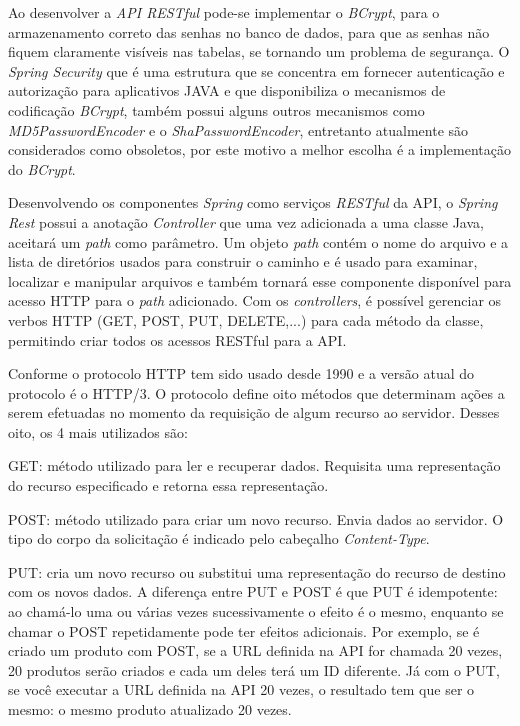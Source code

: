    Ao desenvolver a \textit{API RESTful} pode-se implementar o \textit{BCrypt}, para o armazenamento correto das senhas no banco de dados, para que as senhas não fiquem claramente visíveis nas tabelas, se tornando um problema de segurança. O \textit{Spring Security} que é uma estrutura que se concentra em fornecer autenticação e autorização para aplicativos JAVA e que disponibiliza o mecanismos de codificação \textit{BCrypt}, também possui alguns outros mecanismos como \textit{MD5PasswordEncoder} e o \textit{ShaPasswordEncoder}, entretanto atualmente são considerados como obsoletos, por este motivo a melhor escolha é a implementação do \textit{BCrypt}.
   
    Desenvolvendo os componentes \textit{Spring} como serviços \textit{RESTful} da API, o \textit{Spring Rest} possui a anotação \textit{Controller} que uma vez adicionada a uma classe Java, aceitará um \textit{path} como parâmetro. Um objeto \textit{path} contém o nome do arquivo e a lista de diretórios usados para construir o caminho e é usado para examinar, localizar e manipular arquivos e também tornará esse componente disponível para acesso HTTP para o \textit{path} adicionado. Com os \textit{controllers}, é possível gerenciar os verbos HTTP (GET, POST, PUT, DELETE,...) para cada método da classe, permitindo criar todos os acessos RESTful para a API. 
        
    Conforme  o protocolo HTTP tem sido usado desde 1990 e a versão atual do protocolo é o HTTP/3. O protocolo define oito métodos que determinam ações a serem efetuadas no momento da requisição de algum recurso ao servidor. Desses oito, os 4 mais utilizados são:
    
    GET: método utilizado para ler e recuperar dados. Requisita uma representação do recurso especificado e retorna essa representação.
    
    POST: método utilizado para criar um novo recurso. Envia dados ao servidor. O tipo do corpo da solicitação é indicado pelo cabeçalho \textit{Content-Type}.
    
    PUT: cria um novo recurso ou substitui uma representação do recurso de destino com os novos dados. A diferença entre PUT e POST é que PUT é idempotente: ao chamá-lo uma ou várias vezes sucessivamente o efeito é o mesmo, enquanto se chamar o POST repetidamente pode ter efeitos adicionais. Por exemplo, se é criado um produto com POST, se a URL definida na API for chamada 20 vezes, 20 produtos serão criados e cada um deles terá um ID diferente. Já com o PUT, se você executar a URL definida na API 20 vezes, o resultado tem que ser o mesmo: o mesmo produto atualizado 20 vezes.
    
